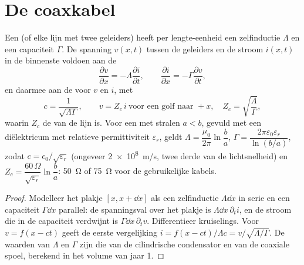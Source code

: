 \section{De coaxkabel}

\begin{proposition}\label{prop:b2:dispersion-wave-packets:coax}
Een  (of elke lijn met twee geleiders) heeft per lengte-eenheid een
zelfinductie $\Lambda$ en een capaciteit $\Gamma$. De spanning $v(x, t)$
tussen de geleiders en de stroom $i(x, t)$ in de binnenste voldoen aan de
\emph{}
\[
\frac{\partial v}{\partial x} = -\Lambda\frac{\partial i}{\partial t} , \qquad
\frac{\partial i}{\partial x} = -\Gamma\frac{\partial v}{\partial t} ,
\]
en daarmee aan de  voor $v$ en $i$, met
\[
c = \frac1{\sqrt{\Lambda\Gamma}} , \qquad
v = Z_c\,i \ \text{voor een golf naar } +x, \quad Z_c = \sqrt{\frac\Lambda\Gamma} ,
\]
waarin $Z_c$ de \emph{} van de lijn is. Voor een
 met stralen $a < b$, gevuld met een diëlektricum met relatieve
permittiviteit $\varepsilon_r$, geldt
$\Lambda = \dfrac{\mu_0}{2\pi}\ln\dfrac ba$,
$\Gamma =
\dfrac{2\pi\varepsilon_0\varepsilon_r}{\ln(b/a)}$, zodat
$c = c_0/\sqrt{\varepsilon_r}$ (ongeveer \qty{2e8}{m/s}, twee derde van de
lichtsnelheid) en
$Z_c = \dfrac{60\,\Omega}
{\sqrt{\varepsilon_r}}\ln\dfrac ba$:
\qty{50}{\ohm} of \qty{75}{\ohm} voor de gebruikelijke kabels.
\end{proposition}

\begin{proof}
Modelleer het plakje $[x, x + \dd x]$ als een zelfinductie $\Lambda\dd x$ in
serie en een capaciteit $\Gamma\dd x$ parallel: de spanningsval over het
plakje is $\Lambda\dd x\,\partial_ti$, en de stroom die in de capaciteit
verdwijnt is $\Gamma\dd x
\,\partial_tv$. Differentieer kruiselings. Voor
$v = f(x - ct)$ geeft de eerste vergelijking
$i = f(x - ct)/\Lambda c = v/\sqrt{\Lambda/\Gamma}$. De waarden van
$\Lambda$ en $\Gamma$ zijn die van de cilindrische condensator en van de
coaxiale spoel, berekend in het volume van jaar 1.
\end{proof}

